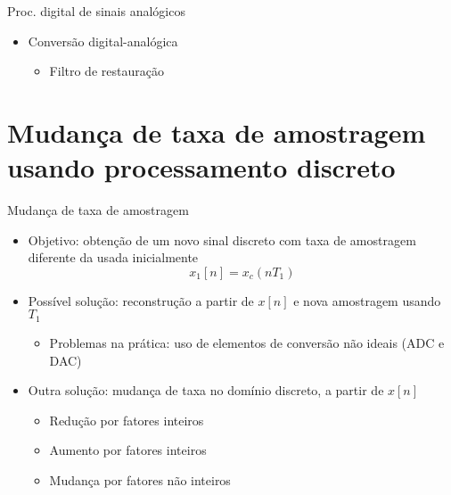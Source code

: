 \begin{slide}{Proc. digital de sinais anal\'ogicos}
\begin{itemize}
   \item Conversão digital-analógica
   \begin{itemize}
      \item Filtro de restauração 
      \begin{figure}
        \centering
      \end{figure}

   \end{itemize}
\end{itemize}
\end{slide}

\section{Mudança de taxa de amostragem usando processamento discreto}
\begin{slide}{Mudança de taxa de amostragem}
	\begin{itemize}
		\item Objetivo: obtenção de um novo sinal discreto com taxa de amostragem diferente da usada inicialmente
			\begin{equation*}
				x_1[n] = x_c(nT_1)
			\end{equation*}
		\item Possível solução: reconstrução a partir de $x[n]$ e nova amostragem usando $T_1$
		\begin{itemize}
			\item Problemas na prática: uso de elementos  de conversão não ideais (ADC e DAC)
		\end{itemize}
		\item Outra solução: mudança de taxa no domínio discreto, a partir de $x[n]$
		\begin{itemize}
			\item Redução por fatores inteiros
			\item Aumento por fatores inteiros
			\item Mudança por fatores não inteiros
		\end{itemize}
	\end{itemize}
\end{slide}

